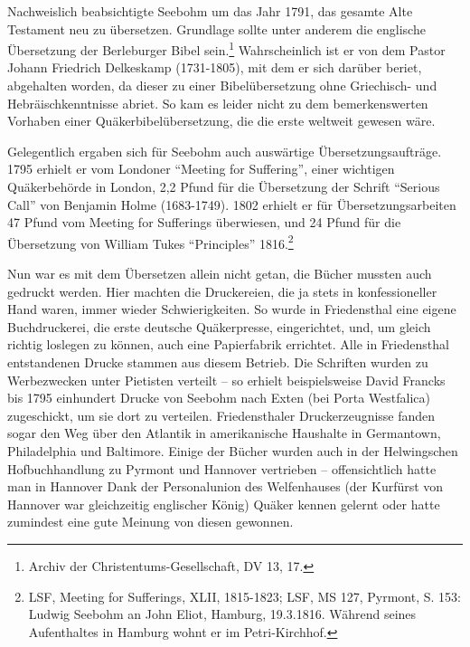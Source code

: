 \medskip

Nachweislich beabsichtigte Seebohm um das Jahr 1791, das gesamte Alte Testament
neu zu übersetzen. Grundlage sollte unter anderem die englische Übersetzung der
Berleburger Bibel sein.\footnote{Archiv der Christentums-Gesellschaft, DV 13,
17.}  Wahrscheinlich ist er von dem Pastor Johann Friedrich Delkeskamp
(1731-1805), mit dem er sich darüber beriet, abgehalten worden, da dieser zu
einer Bibelübersetzung ohne Griechisch- und Hebräischkenntnisse abriet. So kam
es leider nicht zu dem bemerkenswerten Vorhaben einer Quäkerbibelübersetzung,
die die erste weltweit gewesen wäre.

\medskip

Gelegentlich ergaben sich für Seebohm auch auswärtige Übersetzungsaufträge. 1795
erhielt er vom Londoner "`Meeting for Suffering"', einer wichtigen Quäkerbehörde
in London, 2,2 Pfund für die Übersetzung der Schrift "`Serious Call"' von
Benjamin Holme (1683-1749). 1802 erhielt er für Übersetzungsarbeiten 47 Pfund
vom Meeting for Sufferings überwiesen, und 24 Pfund für die Übersetzung von
William Tukes "`Principles"' 1816.\footnote{LSF, Meeting for Sufferings, XLII,
1815-1823; LSF, MS 127, Pyrmont, S. 153:
Ludwig Seebohm an John Eliot, Hamburg, 19.3.1816. Während seines Aufenthaltes in
Hamburg wohnt er im Petri-Kirchhof.}

\medskip

Nun war es mit dem Übersetzen allein nicht getan, die Bücher mussten auch
gedruckt werden. Hier machten die Druckereien, die ja stets in konfessioneller
Hand waren, immer wieder Schwierigkeiten. So wurde in Friedensthal eine eigene
Buchdruckerei, die erste deutsche Quäkerpresse, eingerichtet, und, um gleich
richtig loslegen zu können, auch eine Papierfabrik errichtet. Alle in
Friedensthal entstandenen Drucke stammen aus diesem Betrieb. Die Schriften
wurden zu Werbezwecken unter Pietisten verteilt -- so erhielt beispielsweise
David Francks bis 1795 einhundert Drucke von Seebohm nach Exten (bei Porta
Westfalica) zugeschickt, um sie dort zu verteilen. Friedensthaler
Druckerzeugnisse fanden sogar den Weg über den Atlantik in amerikanische
Haushalte in Germantown, Philadelphia und Baltimore. Einige der Bücher wurden
auch in der Helwingschen Hofbuchhandlung zu Pyrmont und Hannover vertrieben --
offensichtlich hatte man in Hannover Dank der Personalunion des Welfenhauses
(der Kurfürst von Hannover war gleichzeitig englischer König) Quäker kennen
gelernt oder hatte zumindest eine gute Meinung von diesen gewonnen.

